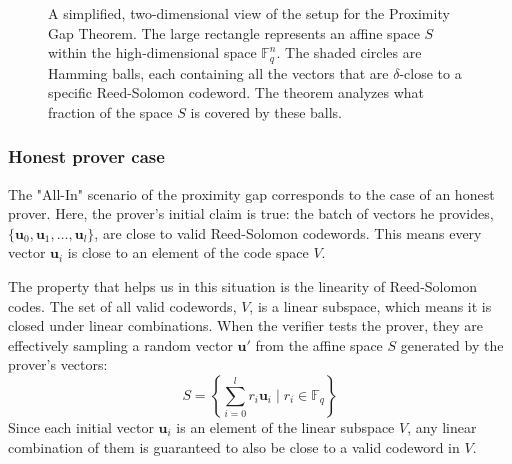 \documentclass{article}
\begin{document}
\begin{figure}[h!]
{}
\caption{A simplified, two-dimensional view of the setup for the Proximity Gap Theorem. The large rectangle represents an affine space $S$ within the high-dimensional space $\mathbb{F}_q^n$. The shaded circles are Hamming balls, each containing all the vectors that are $\delta$-close to a specific Reed-Solomon codeword. The theorem analyzes what fraction of the space $S$ is covered by these balls.}
\label{fig:proximity_gap_setup}
\end{figure}





\subsubsection{Honest prover case}

The "All-In" scenario of the proximity gap corresponds to the case of an honest prover. Here, the prover's initial claim is true: the batch of vectors he provides, $\{\mathbf{u}_0, \mathbf{u}_1, \dots, \mathbf{u}_l\}$, are close to valid Reed-Solomon codewords. This means every vector $\mathbf{u}_i$ is close to an element of the code space $V$.

The property that helps us in this situation is the linearity of Reed-Solomon codes. The set of all valid codewords, $V$, is a linear subspace, which means it is closed under linear combinations. When the verifier tests the prover, they are effectively sampling a random vector $\mathbf{u}'$ from the affine space $S$ generated by the prover's vectors:
\[ S = \left\{ \sum_{i=0}^{l} r_i \mathbf{u}_i \mid r_i \in \mathbb{F}_q \right\} \]
Since each initial vector $\mathbf{u}_i$ is an element of the linear subspace $V$, any linear combination of them is guaranteed to also be close to a valid codeword in $V$.
\end{document}
